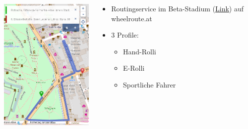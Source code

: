 \documentclass{beamer}
\begin{document}
\begin{frame}{}

  \begin{columns}[c]
    \begin{column}[T]{.6\textwidth}
      \begin{center}
      \vspace{-1cm}
      \includegraphics[width=5.5cm]{routing1_normal.png}
      \end{center}
    \end{column}
    \begin{column}[T]{.4\textwidth}
      \begin{itemize}
      \vspace{1cm}
        \item Routingservice im Beta-Stadium (\href{http://mm.linuxtage.at/osm/routing/wheelchair-normal/?z=17\&center=47.072643\%2C15.452845\&loc=47.073045\%2C15.446059\&loc=47.073841\%2C15.448145\&hl=en\&ly=\&alt=\&df=\&srv=}{Link}) auf wheelroute.at
              \pause
      \vspace{1cm}
            \item 3 Profile:
              \begin{itemize}
                \item Hand-Rolli
                \item E-Rolli
                \item Sportliche Fahrer
          \end{itemize}
        \end{itemize}

    \end{column}
  \end{columns}

\end{frame}
\end{document}
